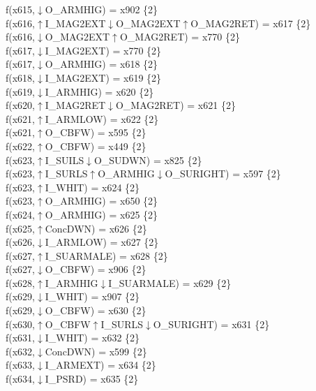 f(x615,$\downarrow$O\_ARMHIG) = x902 \{2\} \\  
f(x616,$\uparrow$I\_MAG2EXT$\downarrow$O\_MAG2EXT$\uparrow$O\_MAG2RET) = x617 \{2\} \\  
f(x616,$\downarrow$O\_MAG2EXT$\uparrow$O\_MAG2RET) = x770 \{2\} \\  
f(x617,$\downarrow$I\_MAG2EXT) = x770 \{2\} \\  
f(x617,$\downarrow$O\_ARMHIG) = x618 \{2\} \\  
f(x618,$\downarrow$I\_MAG2EXT) = x619 \{2\} \\  
f(x619,$\downarrow$I\_ARMHIG) = x620 \{2\} \\  
f(x620,$\uparrow$I\_MAG2RET$\downarrow$O\_MAG2RET) = x621 \{2\} \\  
f(x621,$\uparrow$I\_ARMLOW) = x622 \{2\} \\  
f(x621,$\uparrow$O\_CBFW) = x595 \{2\} \\  
f(x622,$\uparrow$O\_CBFW) = x449 \{2\} \\  
f(x623,$\uparrow$I\_SUILS$\downarrow$O\_SUDWN) = x825 \{2\} \\  
f(x623,$\uparrow$I\_SURLS$\uparrow$O\_ARMHIG$\downarrow$O\_SURIGHT) = x597 \{2\} \\  
f(x623,$\uparrow$I\_WHIT) = x624 \{2\} \\  
f(x623,$\uparrow$O\_ARMHIG) = x650 \{2\} \\  
f(x624,$\uparrow$O\_ARMHIG) = x625 \{2\} \\  
f(x625,$\uparrow$ConcDWN) = x626 \{2\} \\  
f(x626,$\downarrow$I\_ARMLOW) = x627 \{2\} \\  
f(x627,$\uparrow$I\_SUARMALE) = x628 \{2\} \\  
f(x627,$\downarrow$O\_CBFW) = x906 \{2\} \\  
f(x628,$\uparrow$I\_ARMHIG$\downarrow$I\_SUARMALE) = x629 \{2\} \\  
f(x629,$\downarrow$I\_WHIT) = x907 \{2\} \\  
f(x629,$\downarrow$O\_CBFW) = x630 \{2\} \\  
f(x630,$\uparrow$O\_CBFW$\uparrow$I\_SURLS$\downarrow$O\_SURIGHT) = x631 \{2\} \\  
f(x631,$\downarrow$I\_WHIT) = x632 \{2\} \\  
f(x632,$\downarrow$ConcDWN) = x599 \{2\} \\  
f(x633,$\downarrow$I\_ARMEXT) = x634 \{2\} \\  
f(x634,$\downarrow$I\_PSRD) = x635 \{2\} \\  
